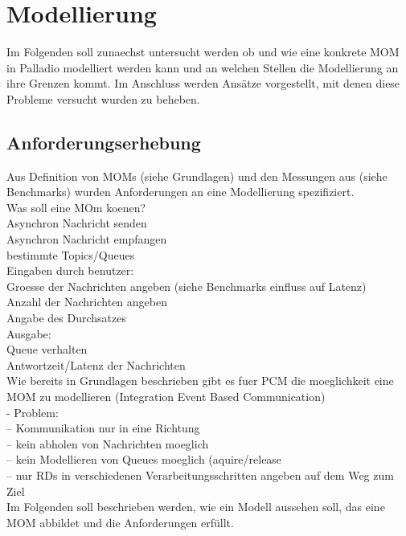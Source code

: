 
\chapter{Modellierung}
\label{ch:modellierung}
Im Folgenden soll zunaechst untersucht werden ob und wie eine konkrete MOM in Palladio modelliert werden kann und an welchen Stellen die Modellierung an ihre Grenzen kommt. Im Anschluss werden Ansätze vorgestellt, mit denen diese Probleme versucht wurden zu beheben.

\section{Anforderungserhebung}
Aus Definition von MOMs (siehe Grundlagen) und den Messungen aus (siehe Benchmarks) wurden Anforderungen an eine Modellierung spezifiziert. \\
Was soll eine MOm koenen?\\
Asynchron Nachricht senden \\
Asynchron Nachricht empfangen \\
bestimmte Topics/Queues\\
Eingaben durch benutzer: \\
Groesse der Nachrichten angeben (siehe Benchmarks einfluss auf Latenz)\\
Anzahl der Nachrichten angeben \\
Angabe des Durchsatzes \\
Ausgabe: \\
Queue verhalten \\
Antwortzeit/Latenz der Nachrichten \\

Wie bereits in Grundlagen beschrieben gibt es fuer PCM die moeglichkeit eine MOM zu modellieren (Integration Event Based Communication)\\
- Problem:  \\
-- Kommunikation nur in eine Richtung \\
-- kein abholen von Nachrichten moeglich \\
-- kein Modellieren von Queues moeglich (aquire/release \\
-- nur RDs in verschiedenen Verarbeitungsschritten angeben auf dem Weg zum Ziel \\
Im Folgenden soll beschrieben werden, wie ein Modell aussehen soll, das eine MOM abbildet und die Anforderungen erfüllt. \\

